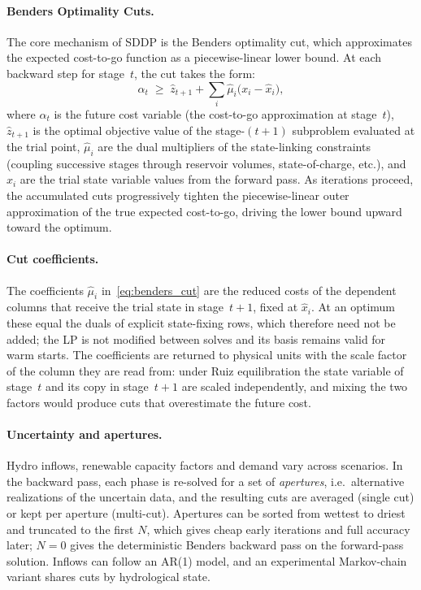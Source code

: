 \paragraph{Benders Optimality Cuts.}
The core mechanism of SDDP is the Benders optimality cut, which
approximates the expected cost-to-go function as a piecewise-linear
lower bound.  At each backward step for stage~$t$, the cut takes the
form:
\begin{equation}
  \label{eq:benders_cut}
  \alpha_t \;\geq\; \hat{z}_{t+1}
    + \sum_{i} \hat{\mu}_i \bigl(x_i - \hat{x}_i\bigr),
\end{equation}
where $\alpha_t$ is the future cost variable (the cost-to-go
approximation at stage~$t$), $\hat{z}_{t+1}$ is the optimal objective
value of the stage-$(t{+}1)$ subproblem evaluated at the trial point,
$\hat{\mu}_i$ are the dual multipliers of the state-linking constraints
(coupling successive stages through reservoir volumes, state-of-charge,
etc.), and $\hat{x}_i$ are the trial state variable values from the
forward pass.  As iterations proceed, the accumulated cuts progressively
tighten the piecewise-linear outer approximation of the true expected
cost-to-go, driving the lower bound upward toward the optimum.

\paragraph{Cut coefficients.}
The coefficients $\hat{\mu}_i$ in~\eqref{eq:benders_cut} are the
reduced costs of the dependent columns that receive the trial state in
stage~$t{+}1$, fixed at $\hat{x}_i$.  At an optimum these equal the duals
of explicit state-fixing rows, which therefore need not be added; the
LP is not modified between solves and its basis remains valid for warm
starts.  The coefficients are returned to physical
units with the scale factor of the column they are read from: under Ruiz
equilibration the state variable of stage~$t$ and its copy in
stage~$t{+}1$ are scaled independently, and mixing the two factors would
produce cuts that overestimate the future cost.

\paragraph{Uncertainty and apertures.}
Hydro inflows, renewable capacity factors and demand vary across
scenarios.  In the backward pass, each phase is re-solved for a set of
\emph{apertures}, i.e.\ alternative realizations of the uncertain data,
and the resulting cuts are averaged (single cut) or kept per aperture
(multi-cut).  Apertures can be sorted from wettest to driest and
truncated to the first $N$, which gives cheap early iterations and full
accuracy later; $N = 0$ gives the deterministic Benders backward pass
on the forward-pass solution.  Inflows can follow an AR(1) model, and
an experimental Markov-chain variant shares cuts by hydrological state.

